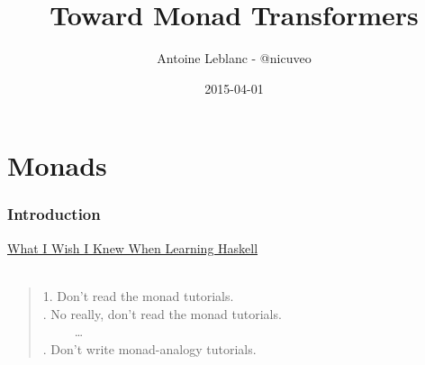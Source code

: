 \documentclass[20pt]{beamer}
\title{Toward Monad Transformers}
\author{Antoine Leblanc - @nicuveo}
\institute{Functional Programmers Paris}
\date{\small{2015-04-01}}
\renewcommand{\(}[1]{\begin{columns}[#1]}
\renewcommand{\)}{\end{columns}}
\newcommand{\<}[1]{\begin{column}{#1\textwidth}}
\renewcommand{\>}{\end{column}}
\begin{document}





{

\togglefalse{showpagenumber}
\begin{frame}[fragile]
  \titlepage
\end{frame}

}

\toggletrue{showpagenumber}
\setcounter{framenumber}{0}




\section{Monads}

\begin{frame}
\frametitle{Introduction}
\href{http://www.stephendiehl.com/what/}{What I Wish I Knew When Learning Haskell}
\pause
~\\~\\
\begin{quote}
    1. Don't read the monad tutorials.\\. No really, don't read the monad tutorials.\\\pause
    ~~~~~\ldots\\. Don't write monad-analogy tutorials.
\end{quote}
\end{frame}
\end{document}
